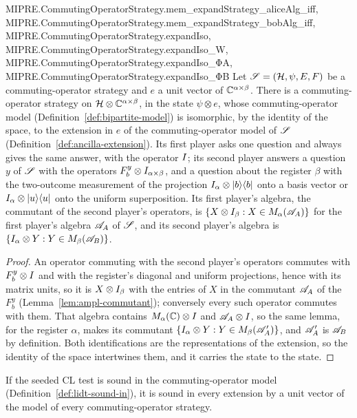 \begin{lemma}
{  MIPRE.CommutingOperatorStrategy.mem_expandStrategy_aliceAlg_iff,
  MIPRE.CommutingOperatorStrategy.mem_expandStrategy_bobAlg_iff,
  MIPRE.CommutingOperatorStrategy.expandIso, MIPRE.CommutingOperatorStrategy.expandIso_W,
  MIPRE.CommutingOperatorStrategy.expandIso_ΦA, MIPRE.CommutingOperatorStrategy.expandIso_ΦB}
\leanok
Let $\mathscr{S} = (\mathcal{H}, \psi, E, F)$ be a commuting-operator strategy and $e$ a unit vector of
$\mathbb{C}^{\alpha \times \beta}$. There is a commuting-operator strategy on $\mathcal{H} \otimes \mathbb{C}^{\alpha \times
\beta}$, in the state $\psi \otimes e$, whose commuting-operator model
(Definition~\ref{def:bipartite-model}) is isomorphic, by the identity of the space, to the extension
in $e$ of the commuting-operator model of $\mathscr{S}$ (Definition~\ref{def:ancilla-extension}). Its
first player asks one question and always gives the same answer, with the operator $I$; its second
player answers a question $y$ of $\mathscr{S}$ with the operators $F^y_b \otimes I_{\alpha \times
\beta}$, and a question about the register $\beta$ with the two-outcome measurement of the
projection $I_\alpha \otimes |b\rangle\langle b|$ onto a basis vector or $I_\alpha \otimes
|u\rangle\langle u|$ onto the uniform superposition. Its first player's algebra, the commutant of the
second player's operators, is $\{X \otimes I_\beta : X \in M_\alpha(\mathscr{A}_A)\}$ for the first
player's algebra $\mathscr{A}_A$ of $\mathscr{S}$, and its second player's algebra is $\{I_\alpha \otimes Y
: Y \in M_\beta(\mathscr{A}_B)\}$.
\end{lemma}

\begin{proof}
\leanok
An operator commuting with the second player's operators commutes with $F^y_b \otimes I$ and with
the register's diagonal and uniform projections, hence with its matrix units, so it is $X \otimes
I_\beta$ with the entries of $X$ in the commutant $\mathscr{A}_A$ of the $F^y_b$
(Lemma~\ref{lem:ampl-commutant}); conversely every such operator commutes with them. That algebra
contains $M_\alpha(\mathbb{C}) \otimes I$ and $\mathscr{A}_A \otimes I$, so the same lemma, for the register
$\alpha$, makes its commutant $\{I_\alpha \otimes Y : Y \in M_\beta(\mathscr{A}_A')\}$, and $\mathscr{A}_A'$ is
$\mathscr{A}_B$ by definition. Both identifications are the representations of the extension, so the
identity of the space intertwines them, and it carries the state to the state.
\end{proof}

\begin{lemma}
\label{lem:lidt-sound-co-expand}
\leanok
If the seeded CL test is sound in the commuting-operator model (Definition~\ref{def:lidt-sound-in}),
it is sound in every extension by a unit vector of the model of every commuting-operator strategy.
\end{lemma}

